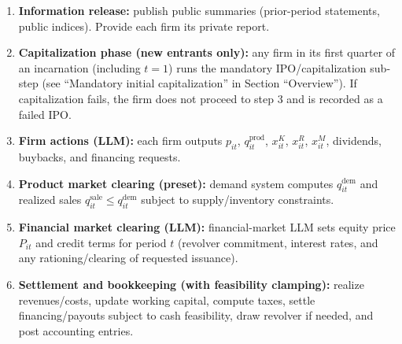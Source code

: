 \documentclass[11pt]{article}
\begin{document}
\begin{enumerate}[leftmargin=*]
    \item \textbf{Information release:} publish public summaries (prior-period statements, public indices). Provide each firm its private report.
    \item \textbf{Capitalization phase (new entrants only):} any firm in its first quarter of an incarnation (including $t=1$) runs the mandatory IPO/capitalization sub-step (see ``Mandatory initial capitalization'' in Section ``Overview''). If capitalization fails, the firm does not proceed to step 3 and is recorded as a failed IPO.
    \item \textbf{Firm actions (LLM):} each firm outputs $p_{it}$, $q^{\text{prod}}_{it}$, $x^K_{it}$, $x^R_{it}$, $x^M_{it}$, dividends, buybacks, and financing requests.
    \item \textbf{Product market clearing (preset):} demand system computes $q^{\text{dem}}_{it}$ and realized sales $q^{\text{sale}}_{it}\le q^{\text{dem}}_{it}$ subject to supply/inventory constraints.
    \item \textbf{Financial market clearing (LLM):} financial-market LLM sets equity price $P_{it}$ and credit terms for period $t$ (revolver commitment, interest rates, and any rationing/clearing of requested issuance).
    \item \textbf{Settlement and bookkeeping (with feasibility clamping):} realize revenues/costs, update working capital, compute taxes, settle financing/payouts subject to cash feasibility, draw revolver if needed, and post accounting entries.
    

\end{enumerate}
\end{document}
